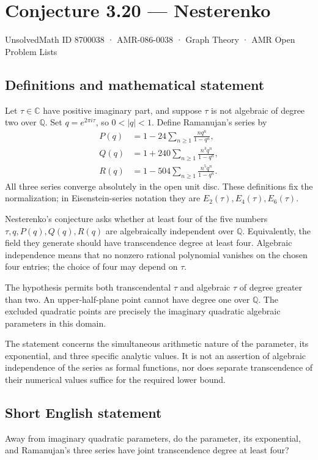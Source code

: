 \documentclass[11pt,a4paper]{article}
\begin{document}
\section*{Conjecture 3.20 — Nesterenko}\label{8700038}
{\small UnsolvedMath ID 8700038 · AMR-086-0038 · Graph Theory · AMR Open Problem Lists}
\subsection{Definitions and mathematical statement}
Let $\tau\in\mathbb C$ have positive imaginary part, and suppose $\tau$ is not algebraic of degree two over $\mathbb Q$. Set $q=e^{2\pi i\tau}$, so $0<|q|<1$. Define Ramanujan's series by
\[
\begin{aligned}
P(q)&=1-24\sum_{n\ge1}\frac{nq^n}{1-q^n},\\
Q(q)&=1+240\sum_{n\ge1}\frac{n^3q^n}{1-q^n},\\
R(q)&=1-504\sum_{n\ge1}\frac{n^5q^n}{1-q^n}.
\end{aligned}
\]
All three series converge absolutely in the open unit disc. These definitions fix the normalization; in Eisenstein-series notation they are $E_2(\tau),E_4(\tau),E_6(\tau)$.

Nesterenko's conjecture asks whether at least four of the five numbers $\tau,q,P(q),Q(q),R(q)$ are algebraically independent over $\mathbb Q$. Equivalently, the field they generate should have transcendence degree at least four. Algebraic independence means that no nonzero rational polynomial vanishes on the chosen four entries; the choice of four may depend on $\tau$.

The hypothesis permits both transcendental $\tau$ and algebraic $\tau$ of degree greater than two. An upper-half-plane point cannot have degree one over $\mathbb Q$. The excluded quadratic points are precisely the imaginary quadratic algebraic parameters in this domain.

The statement concerns the simultaneous arithmetic nature of the parameter, its exponential, and three specific analytic values. It is not an assertion of algebraic independence of the series as formal functions, nor does separate transcendence of their numerical values suffice for the required lower bound.
\subsection{Short English statement}
Away from imaginary quadratic parameters, do the parameter, its exponential, and Ramanujan’s three series have joint transcendence degree at least four?
\end{document}

